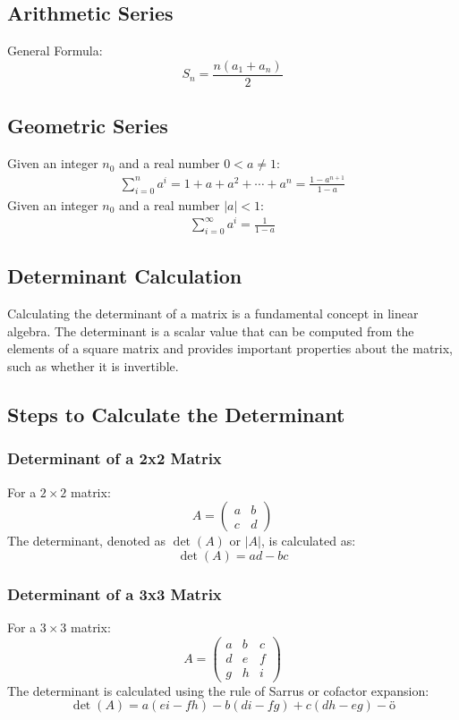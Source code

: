 \subsection{Arithmetic Series}
General Formula: \[
S_n=\frac{n(a_1 + a_n)}{2}
\]

\subsection{Geometric Series}
Given an integer $n_0$ and a real number $0<a \neq 1$:
\begin{align*}
    \sum_{i=0}^n a^{i} = 1 + a + a^2 + \cdots +a^n = \frac{1-a^{n+1}}{1-a} \label{GEOSeries}
\end{align*}
Given an integer $n_0$ and a real number $|a|<1$:
\begin{align*}
    \sum_{i=0}^\infty a^{i} = \frac{1}{1-a}
\end{align*}

\subsection{Determinant Calculation} \label{Determinant Calculation }

Calculating the determinant of a matrix is a fundamental concept in linear algebra. The determinant is a scalar value that can be computed from the elements of a square matrix and provides important properties about the matrix, such as whether it is invertible.

\subsection*{Steps to Calculate the Determinant}

\subsubsection*{Determinant of a 2x2 Matrix}
For a $2 \times 2$ matrix:
\[
A = \begin{pmatrix}
a & b \\
c & d
\end{pmatrix}
\]
The determinant, denoted as $\det(A)$ or $|A|$, is calculated as:
\[
\det(A) = ad - bc
\]

\subsubsection*{Determinant of a 3x3 Matrix}
For a $3 \times 3$ matrix:
\[
A = \begin{pmatrix}
a & b & c \\
d & e & f \\
g & h & i
\end{pmatrix}
\]
The determinant is calculated using the rule of Sarrus or cofactor expansion:
\[
\det(A) = a(ei - fh) - b(di - fg) + c(dh - eg)-ö
\]

